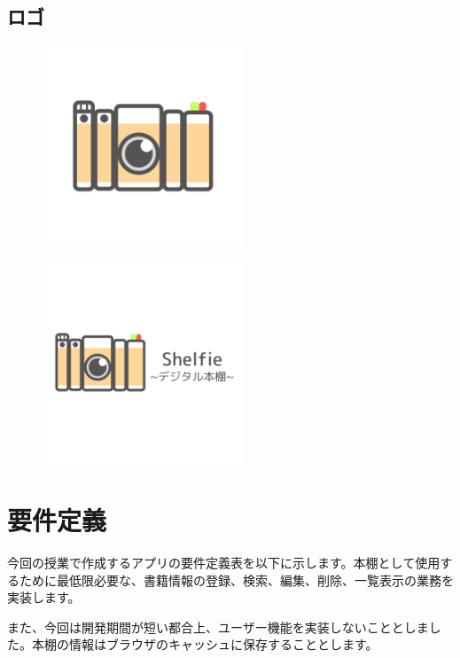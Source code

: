 \documentclass[a4paper, 11pt, titlepage]{jsarticle}
\begin{document}
\clearpage

\subsection{ロゴ}
\begin{figure}[htbp]
\centering
\includegraphics[width=60mm] {shelfie_logo.png}
\label{fig:func}
\end{figure}

\begin{figure}[htbp]
\centering
\includegraphics[width=60mm] {shelfie_logo2.png}
\label{fig:func}
\end{figure}

\clearpage

\section{要件定義}%
今回の授業で作成するアプリの要件定義表を以下に示します。本棚として使用するために最低限必要な、書籍情報の登録、検索、編集、削除、一覧表示の業務を実装します。

また、今回は開発期間が短い都合上、ユーザー機能を実装しないこととしました。本棚の情報はブラウザのキャッシュに保存することとします。
\end{document}
